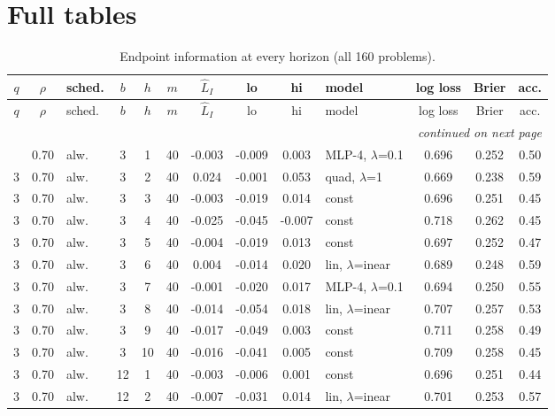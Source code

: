 \documentclass[10pt]{article}
\begin{document}
\section{Full tables}
\begin{scriptsize}
\setlength{\tabcolsep}{3pt}
\begin{longtable}{cclcc c ccc l ccc}
\caption{Endpoint information at every horizon (all 160 problems).}\label{tab:app-endpoint}\\
\toprule
$q$ & $\rho$ & sched. & $b$ & $h$ & $m$ & $\widehat L_I$ & lo & hi & model & log loss & Brier & acc. \\
\midrule
\endfirsthead
\toprule
$q$ & $\rho$ & sched. & $b$ & $h$ & $m$ & $\widehat L_I$ & lo & hi & model & log loss & Brier & acc. \\
\midrule
\endhead
\midrule
\multicolumn{13}{r}{\emph{continued on next page}}\\
\endfoot
\bottomrule
\endlastfoot
3 & 0.70 & alw. & 3 & 1 & 40 & -0.003 & -0.009 & 0.003 & MLP-4, $\lambda$=0.1 & 0.696 & 0.252 & 0.50 \\
3 & 0.70 & alw. & 3 & 2 & 40 & 0.024 & -0.001 & 0.053 & quad, $\lambda$=1 & 0.669 & 0.238 & 0.59 \\
3 & 0.70 & alw. & 3 & 3 & 40 & -0.003 & -0.019 & 0.014 & const & 0.696 & 0.251 & 0.45 \\
3 & 0.70 & alw. & 3 & 4 & 40 & -0.025 & -0.045 & -0.007 & const & 0.718 & 0.262 & 0.45 \\
3 & 0.70 & alw. & 3 & 5 & 40 & -0.004 & -0.019 & 0.013 & const & 0.697 & 0.252 & 0.47 \\
3 & 0.70 & alw. & 3 & 6 & 40 & 0.004 & -0.014 & 0.020 & lin, $\lambda$=inear & 0.689 & 0.248 & 0.59 \\
3 & 0.70 & alw. & 3 & 7 & 40 & -0.001 & -0.020 & 0.017 & MLP-4, $\lambda$=0.1 & 0.694 & 0.250 & 0.55 \\
3 & 0.70 & alw. & 3 & 8 & 40 & -0.014 & -0.054 & 0.018 & lin, $\lambda$=inear & 0.707 & 0.257 & 0.53 \\
3 & 0.70 & alw. & 3 & 9 & 40 & -0.017 & -0.049 & 0.003 & const & 0.711 & 0.258 & 0.49 \\
3 & 0.70 & alw. & 3 & 10 & 40 & -0.016 & -0.041 & 0.005 & const & 0.709 & 0.258 & 0.45 \\
3 & 0.70 & alw. & 12 & 1 & 40 & -0.003 & -0.006 & 0.001 & const & 0.696 & 0.251 & 0.44 \\
3 & 0.70 & alw. & 12 & 2 & 40 & -0.007 & -0.031 & 0.014 & lin, $\lambda$=inear & 0.701 & 0.253 & 0.57 \\

\end{longtable}
\end{scriptsize}
\end{document}
